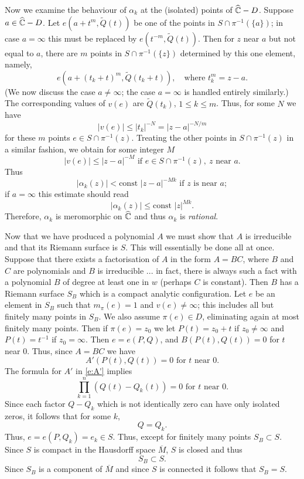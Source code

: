 \documentclass[a4paper,11pt]{article}
\begin{document}
\begin{myproof}
  Now we examine the behaviour of $\alpha_k$ at the (isolated) points
  of $\widehat{{\mathbb C}} - D$.  Suppose $a \in \widehat{{\mathbb C}} - D$.  Let
  $e(a+t^m, \widetilde{Q}(t))$ be one of the points in $S \cap
  \pi^{-1}(\{a\})$; in case $a = \infty$ this must be replaced by
  $e(t^{-m}, \widetilde{Q}(t))$.  Then for $z$ near $a$ but not equal
  to $a$, there are $m$ points in $S \cap \pi^{-1}(\{z\})$ determined
  by this one element, namely,
  $$
  e(a + (t_k+t)^m, \widetilde{Q}(t_k + t)),\quad\text{where }t_k^m = z-a.
  $$
  (We now discuss the case $a\ne \infty$; the case $a = \infty$ is
  handled entirely similarly.)  The corresponding values of $v(e)$ are
  $\widetilde{Q}(t_k)$, $1\le k \le m$.  Thus, for some $N$ we have
  $$
  |v(e)| \le |t_k|^{-N} = |z-a|^{-N/m}
  $$
  for these $m$ points $e\in S\cap \pi^{-1}(z)$.  Treating the other
  points in $S \cap \pi^{-1}(z)$ in a similar fashion, we obtain for
  some integer $M$
  $$
  |v(e)| \le |z-a|^{-M} \text{ if } e \in S \cap \pi^{-1}(z), \ z
  \text{ near }a.
  $$
  Thus
  $$
  |\alpha_k(z)| < \text{const }|z-a|^{-Mk} \text{ if }z\text{ is near
  }a;
  $$
  if $a = \infty$ this estimate should read
  $$
  |\alpha_k(z)| \le \text{const }|z|^{Mk}.
  $$
  Therefore, $\alpha_k$ is meromorphic on $\widehat{{\mathbb C}}$ and thus
  $\alpha_k$ is \emph{rational}.

  Now that we have produced a polynomial $A$ we must show that $A$ is
  irreducible and that its Riemann surface is $S$.  This will
  essentially be done all at once.  Suppose that there exists a
  factorisation of $A$ in the form $A = BC$, where $B$ and $C$ are
  polynomials and $B$ is irreducible ... in fact, there is always such
  a fact with a polynomial $B$ of degree at least one in $w$ (perhaps
  $C$ is constant).  Then $B$ has a Riemann surface $S_B$ which is a
  compact analytic configuration.  Let $e$ be an element in $S_B$ such
  that $m_{\pi}(e) = 1$ and $v(e) \ne \infty$; this includes all but
  finitely many points in $S_B$.  We also assume $\pi(e) \in D$,
  eliminating again at most finitely many points.  Then if $\pi(e) =
  z_0$ we let $P(t) = z_0 + t$ if $z_0 \ne \infty$ and $P(t) = t^{-1}$
  if $z_0 = \infty$.  Then $e = e(P,Q)$, and $B(P(t), Q(t)) = 0$ for
  $t$ near 0.  Thus, since $A = BC$ we have
  $$
  A'(P(t), Q(t)) = 0 \text{ for } t \text{ near } 0.
  $$
  The formula for $A'$ in \eqref{e:A'} implies
  $$
  \prod_{k=1}^n (Q(t) - Q_k(t)) = 0
  \text{ for }t\text{ near }0.
  $$
  Since each factor $Q-Q_k$ which is not identically zero can have
  only isolated zeros, it follows that for some $k$,
  $$
  Q = Q_k.
  $$
  Thus, $e = e(P,Q_k) = e_k \in S$.  Thus, except for finitely many
  points $S_B \subset S$.  Since $S$ is compact in the Hausdorff space
  $\overline{M}$, $S$ is closed and thus
  $$
  S_B \subset S.
  $$
  Since $S_B$ is a component of $\overline{M}$ and since $S$ is
  connected it follows that $\boxed{S_B = S}$.


\end{myproof}
\end{document}
